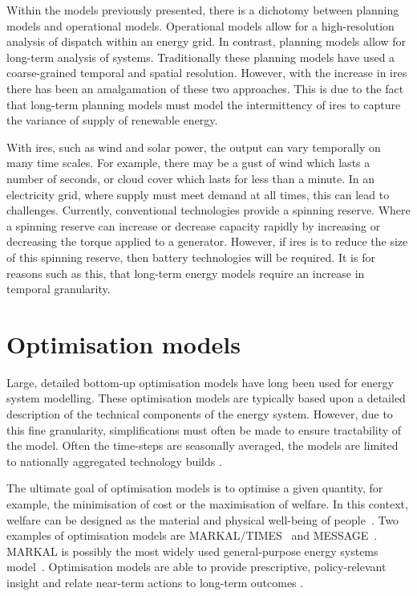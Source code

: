 Within the models previously presented, there is a dichotomy between planning models and operational models. Operational models allow for a high-resolution analysis of dispatch within an energy grid. In contrast, planning models allow for long-term analysis of systems. Traditionally these planning models have used a coarse-grained temporal and spatial resolution. However, with the increase in \acrshort{ires} there has been an amalgamation of these two approaches. This is due to the fact that long-term planning models must model the intermittency of \acrshort{ires} to capture the variance of supply of renewable energy.

With \acrshort{ires}, such as wind and solar power, the output can vary temporally on many time scales. For example, there may be a gust of wind which lasts a number of seconds, or cloud cover which lasts for less than a minute. In an electricity grid, where supply must meet demand at all times, this can lead to challenges. Currently, conventional technologies provide a spinning reserve. Where a spinning reserve can increase or decrease capacity rapidly by increasing or decreasing the torque applied to a generator. However, if \acrshort{ires} is to reduce the size of this spinning reserve, then battery technologies will be required. It is for reasons such as this, that long-term energy models require an increase in temporal granularity.





\section{Optimisation models}
\label{sec:litreview:optimisation}


Large, detailed bottom-up optimisation models have long been used for energy system modelling. These optimisation models are typically based upon a detailed description of the technical components of the energy system. However, due to this fine granularity, simplifications must often be made to ensure tractability of the model. Often the time-steps are seasonally averaged, the models are limited to nationally aggregated technology builds \cite{Pfenninger2014}.

The ultimate goal of optimisation models is to optimise a given quantity, for example, the minimisation of cost or the maximisation of welfare. In this context, welfare can be designed as the material and physical well-being of people~\cite{Keles2017}. Two examples of optimisation models are MARKAL/TIMES~\cite{Fishbone1981} and MESSAGE~\cite{Schrattenholzer1981}. MARKAL is possibly the most widely used general-purpose energy systems model~\cite{Pfenninger2014}. Optimisation models are able to provide prescriptive, policy-relevant insight and relate near-term actions to long-term outcomes \cite{DeCarolis2012}.

